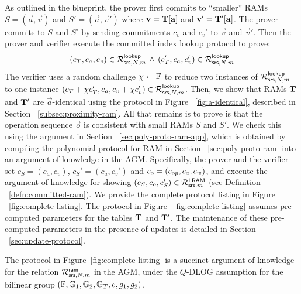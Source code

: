 As outlined in the blueprint, the prover first commits to ``smaller'' RAMs $S=(\vec{a},\vec{v})$ and $S'=(\vec{a},\vec{v}')$
where $\mathbf{v}=\mathbf{T}[\mathbf{a}]$ and $\mathbf{v}'=\mathbf{T}'[\mathbf{a}]$. The prover commits to $S$ and $S'$ by sending commitments
$c_v$ and $c_v'$ to $\vec{v}$ and $\vec{v}'$. Then the prover and verifier execute the committed index lookup protocol to
prove:
\begin{equation}
(c_T, c_a, c_v)\in \mathcal{R}^{\mathsf{lookup}}_{\mathsf{srs},N,m}\, \wedge\, (c_T', c_a, c_v')\in \mathcal{R}^{\mathsf{lookup}}_{\mathsf{srs},N,m}
\end{equation}
The verifier uses a random challenge $\chi\gets \mathbb{F}$ to reduce two instances of $\mathcal{R}^{\mathsf{lookup}}_{\mathsf{srs},N,m}$ to one instance
$(c_T + \chi c_T', c_a, c_v + \chi c_v')\in \mathcal{R}^{\mathsf{lookup}}_{\mathsf{srs},N,m}$. Then, we show that
RAMs $\mathbf{T}$ and $\mathbf{T}'$ are $\vec{a}$-identical using the protocol in Figure ~\ref{fig:a-identical}, described
in Section ~\ref{subsec:proximity-ram}.
All that remains is to prove is that the operation sequence $\vec{o}$ is consistent with small RAMs $S$ and $S'$.
We check this using the argument in Section ~\ref{sec:poly-proto-ram-app}, which is obtained by compiling the
polynomial protocol for RAM in Section ~\ref{sec:poly-proto-ram} into an argument of knowledge in the AGM.
Specifically, the prover and the verifier set
$c_S = (c_a, c_v)$, $c_S'=(c_a, c_v')$ and $c_o = (c_{op}, c_a, c_w)$, and execute the argument of knowledge for
showing $(c_S, c_o, c_S')\in \mathcal{R}^{\mathsf{LRAM}}_{\mathsf{srs},m}$ (see Definition ~\ref{defn:committed-ram}). We provide the complete protocol
listing in Figure ~\ref{fig:complete-listing}. The protocol in Figure ~\ref{fig:complete-listing} assumes pre-computed parameters
for the tables $\mathbf{T}$ and $\mathbf{T}'$. The maintenance of these pre-computed parameters in the presence of updates
is detailed in Section ~\ref{sec:update-protocol}.

\begin{theorem}\label{thm:committed-ram}
The protocol in Figure~\ref{fig:complete-listing} is a succinct argument of knowledge for the relation $\mathcal{R}^{\mathsf{ram}}_{\mathsf{srs},N,m}$ in
the AGM, under the $Q$-DLOG assumption for the bilinear group $(\mathbb{F},\mathbb{G}_1,\mathbb{G}_2,\mathbb{G}_T,e,g_1,g_2)$.
\end{theorem}

